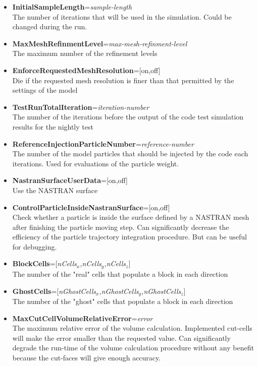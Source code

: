 \begin{itemize}
\item {\bf InitialSampleLength}={\it sample-length} \\ The number of iterations that will be used in the simulation. Could be changed during the run.

\item {\bf MaxMeshRefinmentLevel}={\it max-mesh-refinment-level} \\ The maximum number of the refinement levels

\item {\bf EnforceRequestedMeshResolution}=[on,off] \\ Die if the requested mesh resolution is finer than that permitted by the settings of the model

\item {\bf TestRunTotalIteration}={\it iteration-number} \\ The number of the iterations before the output of the code test simulation results for the nightly test

\item {\bf ReferenceInjectionParticleNumber}={\it reference-number} \\ The number of the model particles that should be injected by the code each iterations. Used for evaluations of the particle weight.

\item {\bf NastranSurfaceUserData}=[on,off] \\ Use the NASTRAN surface 

\item {\bf ControlParticleInsideNastranSurface}=[on,off] \\ Check whether a particle is inside the surface defined by a NASTRAN mesh after finishing the particle moving step. Can significantly decrease the efficiency of the particle trajectory integration procedure. But can be useful for debugging. 

\item {\bf BlockCells}=[{\it nCells$_x$,nCells$_y$,nCells$_z$}] \\ The number of the "real" cells that populate a block in each direction

\item {\bf GhostCells}=[{\it nGhostCells$_x$,nGhostCells$_y$,nGhostCells$_z$}] \\ The number of the "ghost" cells that populate a block in each direction

\item {\bf MaxCutCellVolumeRelativeError}={\it error} \\ The maximum relative error of the volume calculation. Implemented cut-cells will make the error smaller than the requested value. Can significantly degrade the run-time of the volume calculation procedure without any benefit because the cut-faces will give enough accuracy. 

\end{itemize}




